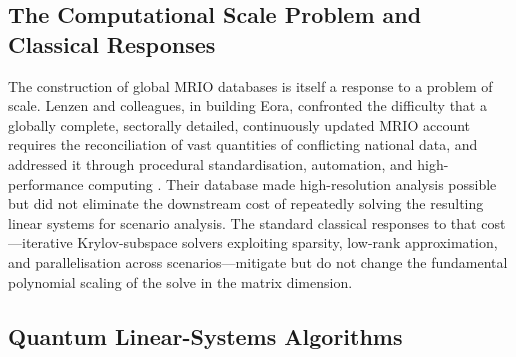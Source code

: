 \documentclass[letterpaper, 10 pt, conference]{ieeeconf}
\begin{document}
\subsection{The Computational Scale Problem and Classical Responses}

The construction of global MRIO databases is itself a response to a problem of scale. Lenzen and colleagues, in building Eora, confronted the difficulty that a globally complete, sectorally detailed, continuously updated MRIO account requires the reconciliation of vast quantities of conflicting national data, and addressed it through procedural standardisation, automation, and high-performance computing \cite{lenzen2012, lenzen2013}. Their database made high-resolution analysis possible but did not eliminate the downstream cost of repeatedly solving the resulting linear systems for scenario analysis. The standard classical responses to that cost---iterative Krylov-subspace solvers exploiting sparsity, low-rank approximation, and parallelisation across scenarios---mitigate but do not change the fundamental polynomial scaling of the solve in the matrix dimension.

\subsection{Quantum Linear-Systems Algorithms}
\end{document}
